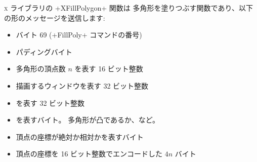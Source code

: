 \begin{example}
\textsc{x} ライブラリの \ml+XFillPolygon+ 関数は
多角形を塗りつぶす関数であり、以下の形のメッセージを送信します:
\begin{itemize}
\item バイト 69 (\ml+FillPoly+ コマンドの番号)
\item パディングバイト
\item 多角形の頂点数 $n$ を表す 16 ビット整数
\item 描画するウィンドウを表す 32 ビット整数
\item {} を表す 32 ビット整数
\item {} を表すバイト。 多角形が凸であるか、など。
\item 頂点の座標が絶対か相対かを表すバイト
\item 頂点の座標を 16 ビット整数でエンコードした $4n$ バイト
\end{itemize}
\enlargethispage{1\onelineskip} %
\end{example}
\pagebreak

